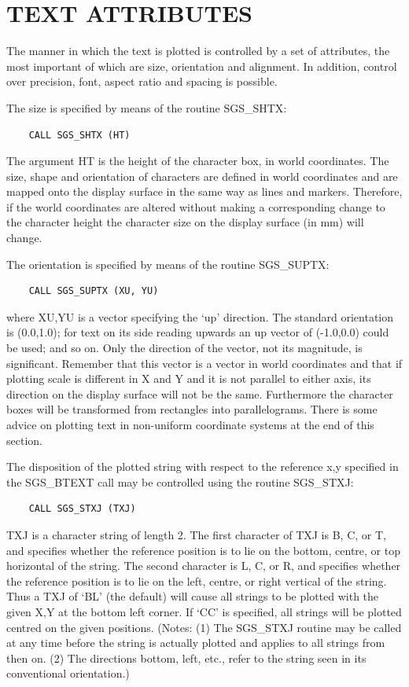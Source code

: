\documentclass[11pt]{article}
\newcommand{\htmlref}[2]{#1}
\begin{document}
\section {TEXT ATTRIBUTES}

The manner in which the text is plotted is controlled by a set
of attributes, the most important of which
are size, orientation and alignment.  In addition,
control over precision, font, aspect ratio and spacing is
possible.

The size is specified by means of the routine \htmlref{SGS\_SHTX}{SGS_SHTX}:
\begin{verbatim}
    CALL SGS_SHTX (HT)
\end{verbatim}
The argument HT is the height of the character box, in world
coordinates.  The size, shape and orientation of characters are defined
in world coordinates and are mapped onto the display surface in
the same way as lines and markers.  Therefore,
if the world coordinates are altered
without making a corresponding change to the character height the character
size on the display surface (in mm) will change.

The orientation is specified by means of the routine
\htmlref{SGS\_SUPTX}{SGS_SUPTX}:
\begin{verbatim}
    CALL SGS_SUPTX (XU, YU)
\end{verbatim}
where XU,YU is a vector specifying the `up'
direction.  The standard orientation is (0.0,1.0);  for
text on its side reading upwards an up vector of (-1.0,0.0) could
be used;  and so on.  Only the direction of the vector, not its
magnitude, is significant.  Remember that this vector is a vector in world
coordinates and that if plotting scale is different in X and Y and it is
not parallel to either axis, its direction on the display surface will not
be the same.  Furthermore the character boxes will be transformed from
rectangles into parallelograms.  There is some advice on plotting text in
non-uniform coordinate systems at the end of this section.

The disposition of the plotted string with respect to
the reference x,y
specified in the \htmlref{SGS\_BTEXT}{SGS_BTEXT}
call may be controlled using the
routine \htmlref{SGS\_STXJ}{SGS_STXJ}:
\begin{verbatim}
    CALL SGS_STXJ (TXJ)
\end{verbatim}
TXJ is a character string of length 2.  The first character of TXJ
is B, C, or T, and specifies whether the reference position is to lie
on the bottom, centre, or top horizontal of the string.  The second
character is L, C, or R, and specifies whether the reference position
is to lie on the left, centre, or right vertical of the string.  Thus
a TXJ of `BL' (the default) will cause all strings to be plotted
with the given X,Y at the bottom left corner.  If `CC' is specified,
all strings will be plotted centred on the given
positions.  (Notes:  (1) The
SGS\_STXJ routine may be called at any time before the string is actually
plotted and applies to all strings from then on.  (2) The directions
bottom, left, etc., refer to the string seen in its conventional
orientation.)
\end{document}
